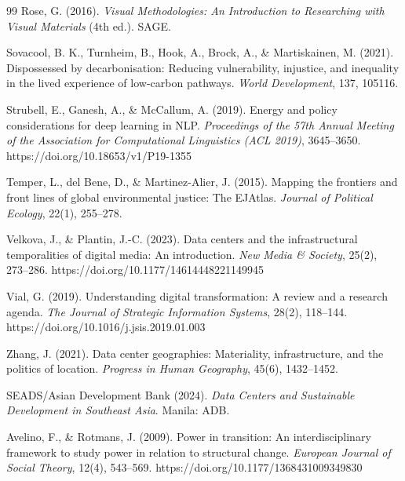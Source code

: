 \documentclass[review]{elsarticle}
\begin{document}
\begin{thebibliography}{99}
Rose, G. (2016). \textit{Visual Methodologies: An Introduction to Researching with Visual Materials} (4th ed.). SAGE.

Sovacool, B. K., Turnheim, B., Hook, A., Brock, A., \& Martiskainen, M. (2021). Dispossessed by decarbonisation: Reducing vulnerability, injustice, and inequality in the lived experience of low-carbon pathways. \textit{World Development}, 137, 105116.

Strubell, E., Ganesh, A., \& McCallum, A. (2019). Energy and policy considerations for deep learning in NLP. \textit{Proceedings of the 57th Annual Meeting of the Association for Computational Linguistics (ACL 2019)}, 3645--3650. https://doi.org/10.18653/v1/P19-1355

Temper, L., del Bene, D., \& Martinez-Alier, J. (2015). Mapping the frontiers and front lines of global environmental justice: The EJAtlas. \textit{Journal of Political Ecology}, 22(1), 255--278.

Velkova, J., \& Plantin, J.-C. (2023). Data centers and the infrastructural temporalities of digital media: An introduction. \textit{New Media \& Society}, 25(2), 273--286. https://doi.org/10.1177/14614448221149945

Vial, G. (2019). Understanding digital transformation: A review and a research agenda. \textit{The Journal of Strategic Information Systems}, 28(2), 118--144. https://doi.org/10.1016/j.jsis.2019.01.003

Zhang, J. (2021). Data center geographies: Materiality, infrastructure, and the politics of location. \textit{Progress in Human Geography}, 45(6), 1432--1452.

SEADS/Asian Development Bank (2024). \textit{Data Centers and Sustainable Development in Southeast Asia}. Manila: ADB.


Avelino, F., \& Rotmans, J. (2009). Power in transition: An interdisciplinary framework to study power in relation to structural change. \textit{European Journal of Social Theory}, 12(4), 543--569. https://doi.org/10.1177/1368431009349830


\end{thebibliography}
\end{document}
